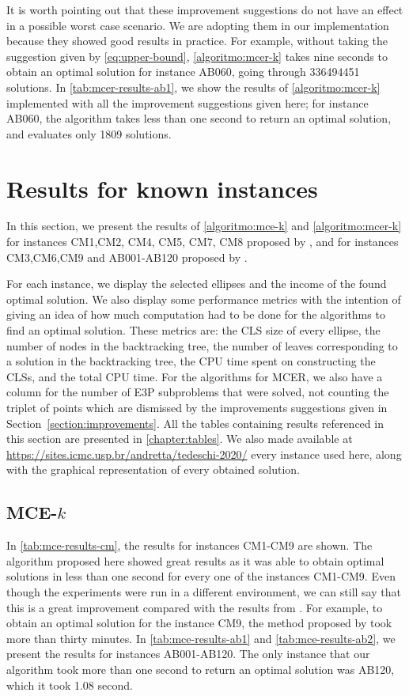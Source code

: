 It is worth pointing out that these improvement suggestions do not have an effect in a possible worst case scenario. We are adopting them in our implementation because they showed good results in practice.
For example, without taking the suggestion given by \autoref{eq:upper-bound}, \autoref{algoritmo:mcer-k} takes nine seconds to obtain an optimal solution for instance AB060, going through \num{336494451} solutions.
In \autoref{tab:mcer-results-ab1}, we show the results of \autoref{algoritmo:mcer-k} implemented with all the improvement suggestions given here; for instance AB060, the algorithm takes less than one second to return an optimal solution, and evaluates only \num{1809} solutions.

\section{Results for known instances}

In this section, we present the results of \autoref{algoritmo:mce-k} and \autoref{algoritmo:mcer-k} for instances CM1,CM2, CM4, CM5, CM7, CM8 proposed by , and for instances CM3,CM6,CM9 and AB001-AB120 proposed by . 

For each instance, we display the selected ellipses and the income of the found optimal solution. 
We also display some performance metrics with the intention of giving an idea of how much computation had to be done for the algorithms to find an optimal solution. These metrics are: 
the CLS size of every ellipse, the number of nodes in the backtracking tree, the number of leaves corresponding to a solution in the backtracking tree, the CPU time spent on constructing the CLSs, and the total CPU time.
For the algorithms for MCER, we also have a column for the number of E3P subproblems that were solved, not counting the triplet of points which are dismissed by the improvements suggestions given in Section~\ref{section:improvements}. All the tables containing results referenced in this section are presented in \autoref{chapter:tables}. 
We also made available at \url{https://sites.icmc.usp.br/andretta/tedeschi-2020/} every instance used here, along with the graphical representation of every obtained solution.


\subsection{MCE-$k$}

In \autoref{tab:mce-results-cm}, the results for instances CM1-CM9 are shown. 
The algorithm proposed here showed great results as it was able to obtain optimal solutions in less than one second for every one of the instances CM1-CM9.
Even though the experiments were run in a different environment, we can still say that this is a great improvement compared with the results from . For example, to obtain an optimal solution for the instance CM9, the method proposed by  took more than thirty minutes.
In \autoref{tab:mce-results-ab1} and \autoref{tab:mce-results-ab2}, we present the results for instances AB001-AB120. The only instance that our algorithm took more than one second to return an optimal solution was AB120, which it took 1.08 second.


